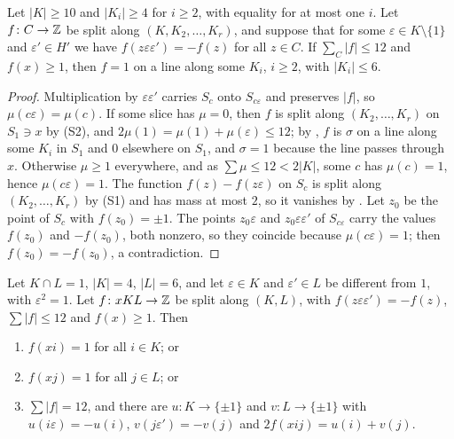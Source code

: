 \begin{lemma}\label{lem:oddbig}
Let $|K|\ge10$ and $|K_{i}|\ge4$ for $i\ge2$, with equality for at most one
$i$. Let $f\colon C\to\mathbb{Z}$ be split along $(K,K_{2},\dots,K_{r})$, and suppose
that for some $\varepsilon\in K\setminus\{1\}$ and $\varepsilon'\in H'$ we
have $f(z\varepsilon\varepsilon')=-f(z)$ for all $z\in C$. If $\sum_{C}|f|
\le12$ and $f(x)\ge1$, then $f=1$ on a line along some $K_{i}$, $i\ge2$, with
$|K_{i}|\le6$.
\end{lemma}

\begin{proof}
Multiplication by $\varepsilon\varepsilon'$ carries $S_{c}$ onto
$S_{c\varepsilon}$ and preserves $|f|$, so $\mu(c\varepsilon)=\mu(c)$. If
some slice has $\mu=0$, then $f$ is split along $(K_{2},\dots,K_{r})$ on
$S_{1}\ni x$ by (S2), and $2\mu(1)=\mu(1)+\mu(\varepsilon)\le12$; by
, $f$ is $\sigma$ on a line along some $K_{i}$ in $S_{1}$ and
$0$ elsewhere on $S_{1}$, and $\sigma=1$ because the line passes through $x$.
Otherwise $\mu\ge1$ everywhere, and as $\sum\mu\le12<2|K|$, some $c$ has
$\mu(c)=1$, hence $\mu(c\varepsilon)=1$. The function $f(z)-f(z\varepsilon)$
on $S_{c}$ is split along $(K_{2},\dots,K_{r})$ by (S1) and has mass at most
$2$, so it vanishes by . Let $z_{0}$ be the point of $S_{c}$
with $f(z_{0})=\pm1$. The points $z_{0}\varepsilon$ and
$z_{0}\varepsilon\varepsilon'$ of $S_{c\varepsilon}$ carry the values
$f(z_{0})$ and $-f(z_{0})$, both nonzero, so they coincide because
$\mu(c\varepsilon)=1$; then $f(z_{0})=-f(z_{0})$, a contradiction.
\end{proof}

\begin{lemma}\label{lem:twoD}
Let $K\cap L=1$, $|K|=4$, $|L|=6$, and let $\varepsilon\in K$ and
$\varepsilon'\in L$ be different from $1$, with $\varepsilon^{2}=1$. Let
$f\colon xKL\to\mathbb{Z}$ be split along $(K,L)$, with $f(z\varepsilon
\varepsilon')=-f(z)$, $\sum|f|\le12$ and $f(x)\ge1$. Then
\begin{enumerate}[label=\textup{(\alph*)}]
\item $f(xi)=1$ for all $i\in K$; or
\item $f(xj)=1$ for all $j\in L$; or
\item $\sum|f|=12$, and there are $u\colon K\to\{\pm1\}$ and $v\colon
L\to\{\pm1\}$ with $u(i\varepsilon)=-u(i)$, $v(j\varepsilon')=-v(j)$ and
$2f(xij)=u(i)+v(j)$.
\end{enumerate}
\end{lemma}

